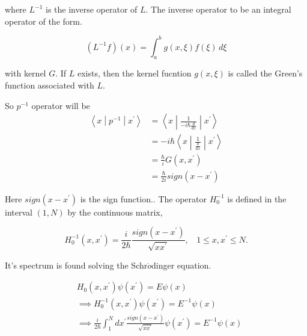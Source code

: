 \documentclass[12pt]{report}
\newcommand*{\1}{\hspace{1pt}}
\begin{document}
        where $L^{-1}$ is the inverse operator of $L$. The inverse operator to be an integral operator of the form.

        \begin{equation}
            \left(L^{-1}f\right)(x) = \int_{a}^{b} g(x,\xi ) f(\xi) \,d\xi 
        \end{equation}

        with kernel $G$. If $L$ exists, then the kernel fucntion $g(x,\xi)$ is called the Green's function associated with $L$.

        So $p^{-1}$ operator will be
        \begin{equation}
            \begin{split}
                \left\langle x\middle|p^{-1}\middle|x^{'}\right\rangle &= \left\langle x\middle| \frac{1}{-i\hbar\frac{d}{dx}}\middle| x^{'}\right\rangle \\ 
                &= -i\hbar\left\langle x\middle| \frac{1}{\frac{d}{dx}}\middle| x^{'}\right\rangle \\
                &= \frac{\hbar}{i}G(x,x^{'}) \\ 
                &= \frac{\hbar}{2i} sign(x-x^{'})
            \end{split}
        \end{equation}

        Here $sign(x-x^{'})$ is the sign function.\cite{s10}. The operator $H_{0}^{-1}$ is defined in the interval $(1,N)$ by the continuous matrix,

        \begin{equation}
            H_{0} ^{-1} (x,x^{'}) = \frac{i}{2\hbar} \frac{sign(x-x^{'})}{\sqrt{x x^{'}}},  \ \ \ \ 1\leqslant x , x^{'} \leqslant N.
        \end{equation}

        It's spectrum is found solving the Schr$\ddot{o}$dinger equation. 

        \begin{equation}
            \begin{split}
                &H_{0}(x,x^{'}) \psi(x^{'}) = E \psi(x) \\ 
                & \implies H_{0} ^{-1}(x,x^{'}) \psi(x^{'}) = E^{-1} \psi(x) \\ 
                & \implies \frac{i}{2\hbar} \int _{1}^{N} dx^{'}\frac{sign(x-x^{'})}{\sqrt{x x^{'}}} \psi(x^{'}) = E^{-1} \psi(x) \\ 
            \end{split}
        \end{equation}
\end{document}
